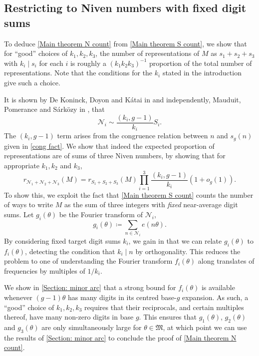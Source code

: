 \documentclass[hidelinks,11pt,reqno]{amsart}
\theoremstyle{remark}
\begin{document}
\subsection{Restricting to Niven numbers with fixed digit sums}

To deduce \cref{Main theorem N count} from \cref{Main theorem S count}, we show that for \enquote{good} choices of $k_{1},k_{2},k_{3}$, the number of representations of $M$ as $s_{1}+s_{2}+s_{3}$ with $k_{i}\mid s_{i}$ for each $i$ is roughly a $(k_{1}k_{2}k_{3})^{-1}$ proportion of the total number of representations. Note that the conditions for the $k_{i}$ stated in the introduction give such a choice. 

It is shown by De Koninck, Doyon and K\'{a}tai in \cite{de2003counting} and independently, Mauduit, Pomerance and S\'{a}rk\"{o}zy in \citep[Theorem~C]{mauduit2005distribution}, that
 \begin{equation}\label{size N}
 \mathcal{N}_{i}\sim \frac{(k_{i},g-1)}{k_{i}}S_{i}.\end{equation}
The $(k_{i},g-1)$ term arises from the congruence relation between $n$ and $s_{g}(n)$ given in \cref{cong fact}. We show that indeed the expected proportion of representations are of sums of three Niven numbers, by showing that for appropriate $k_{1}
,k_{2}$ and $k_{3}$,
\[r_{\mathcal{N}_{1}+\mathcal{N}_{2}+\mathcal{N}_{3}}(M)=r_{S_{1}+S_{2}+S_{3}}(M)\prod_{i=1}^{3}\frac{(k_{i},g-1)}{k_{i}}(1+o_{g}(1)).\]
To show this, we exploit the fact that \cref{Main theorem S count} counts the number of ways to write $M$ as the sum of three integers with \textit{fixed} near-average digit sums. Let $g_{i}(\theta)$ be the Fourier transform of $\mathcal{N}_{i}$,
\[g_{i}(\theta)\coloneq \sum_{n\in \mathcal{N}_{i}}e(n\theta).\]
By considering fixed target digit sums $k_{i}$, we gain in that we can relate $g_{i}(\theta)$ to $f_{i}(\theta)$, detecting the condition that $k_{i}\mid n$ by orthogonality. This reduces the problem to one of understanding the Fourier transform $f_{i}(\theta)$ along translates of frequencies by multiples of $1/k_{i}$. 

 We show in \cref{Section: minor arc} that a strong bound for $f_{i}(\theta)$ is available whenever $(g-1)\theta$ has many digits in its centred base-$g$ expansion. As such, a \enquote{good} choice of $k_{1},k_{2},k_{3}$ requires that their reciprocals, and certain multiples thereof, have many non-zero digits in base $g$. This ensures that $g_{1}(\theta)$, $g_{2}(\theta)$ and $g_{3}(\theta)$ are only simultaneously large for $\theta \in \mathfrak{M}$, at which point we can use the results of \cref{Section: minor arc} to conclude the proof of \cref{Main theorem N count}.
\end{document}
